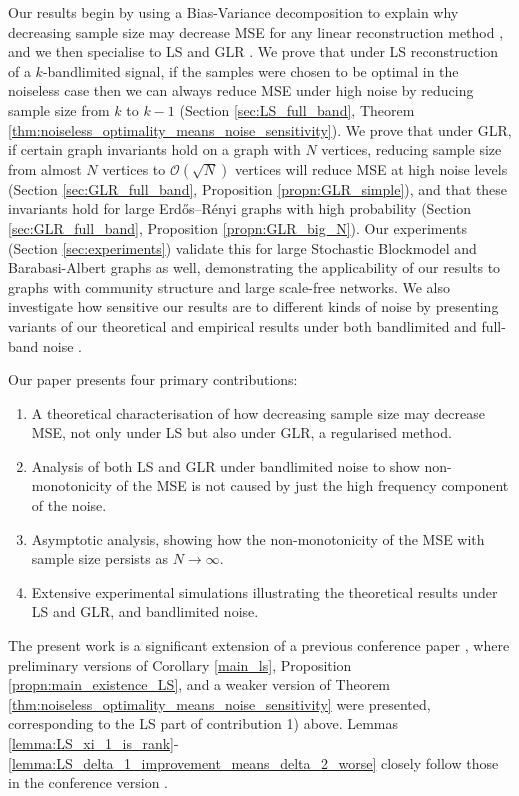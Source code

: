 Our results begin by using a Bias-Variance decomposition to explain why decreasing sample size may decrease MSE for any linear reconstruction method , and we then specialise to LS and GLR . We prove that under LS reconstruction of a $k$-bandlimited signal, if the samples were chosen to be optimal in the noiseless case then we can always reduce MSE under high noise by reducing sample size from $k$ to $k-1$ {\color{black}(Section \ref{sec:LS_full_band}, Theorem \ref{thm:noiseless_optimality_means_noise_sensitivity})}. We prove that under GLR, if certain graph invariants hold on a graph with $N$ vertices, reducing sample size from almost $N$ vertices to $\mathcal{O}(\sqrt{N})$ vertices will reduce MSE at high noise levels {\color{black}(Section \ref{sec:GLR_full_band}, Proposition \ref{propn:GLR_simple})}, and that these invariants hold for large Erdős–Rényi graphs with high probability {\color{black}(Section \ref{sec:GLR_full_band}, Proposition \ref{propn:GLR_big_N})}. Our experiments {\color{black}(Section \ref{sec:experiments})} validate this for {\color{black} large} Stochastic Blockmodel and Barabasi-Albert graphs as well, {\color{black} demonstrating the applicability of our results to graphs with community structure and large scale-free networks}. We also investigate how sensitive our results are to different kinds of noise by presenting variants of our theoretical and empirical results under both bandlimited  and full-band noise . 

Our paper presents four primary contributions: 
\begin{enumerate}
    \item A theoretical characterisation of how decreasing sample size may decrease MSE, not only under LS  but also under GLR, a regularised method. 
    \item Analysis of both LS and GLR under bandlimited noise to show non-monotonicity of the MSE is not caused by just the high frequency component of the noise.
    \item Asymptotic analysis, showing how the non-monotonicity of the MSE with sample size persists as $N \to \infty$.
    \item Extensive experimental simulations illustrating the theoretical results under LS and GLR, and bandlimited noise.
\end{enumerate}
The present work is a significant extension of a previous conference paper \cite{sripathmanathan2023impact}, where
preliminary versions of Corollary \ref{main_ls}, Proposition \ref{propn:main_existence_LS}, and a weaker version of Theorem \ref{thm:noiseless_optimality_means_noise_sensitivity} were presented, corresponding to the LS part of contribution 1) above. 
Lemmas \ref{lemma:LS_xi_1_is_rank}-\ref{lemma:LS_delta_1_improvement_means_delta_2_worse} closely follow those in the conference version \cite{sripathmanathan2023impact}.


